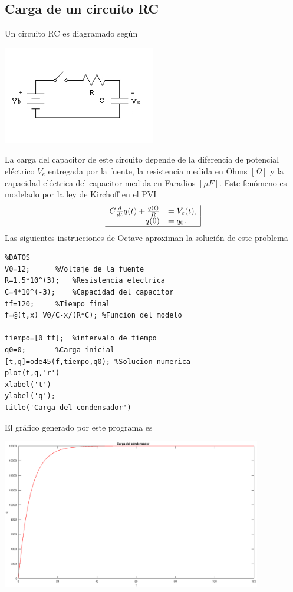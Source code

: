 \documentclass[letter,11pt]{article}
\newcommand{\octave}{{\sc Octave} }
\begin{document}
\subsection{Carga de un circuito RC}
Un circuito RC es diagramado seg\'un 
\begin{center}
\includegraphics[width=0.5\textwidth]{cap1.jpg}
\end{center}
La carga del capacitor de este circuito depende de la diferencia de potencial el\'ectrico $V_{e}$ entregada por la fuente, la resistencia medida en Ohms $[\Omega]$ y la capacidad el\'ectrica del capacitor medida en Faradios $[\mu F]$. Este fen\'omeno es modelado por la ley de Kirchoff en el PVI
$$
\begin{array}{rl|}
C \frac{d}{dt}q(t)+\frac{q(t)}{R} & = V_{e}(t),\\
q(0) & =q_0.\\ \hline
\end{array}
$$
Las siguientes instrucciones de \octave aproximan la soluci\'on de este problema
\begin{lstlisting}
%DATOS
V0=12;		%Voltaje de la fuente
R=1.5*10^(3);	%Resistencia electrica
C=4*10^(-3); 	%Capacidad del capacitor
tf=120;		%Tiempo final 
f=@(t,x) V0/C-x/(R*C); %Funcion del modelo

tiempo=[0 tf]; 	%intervalo de tiempo
q0=0;		%Carga inicial
[t,q]=ode45(f,tiempo,q0); %Solucion numerica
plot(t,q,'r')
xlabel('t')
ylabel('q');
title('Carga del condensador')
\end{lstlisting}
El gr\'afico generado por este programa es
\begin{center}
\includegraphics[width=0.85\textwidth]{eje1.eps}
\end{center}
\end{document}
